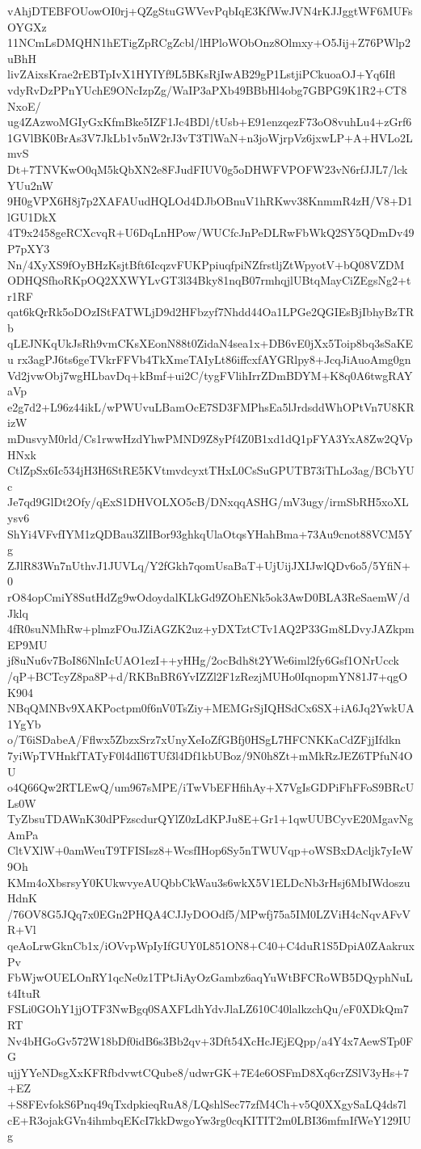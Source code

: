 vAhjDTEBFOUowOI0rj+QZgStuGWVevPqbIqE3KfWwJVN4rKJJggtWF6MUFsOYGXz
11NCmLsDMQHN1hETigZpRCgZcbl/lHPloWObOnz8Olmxy+O5Jij+Z76PWlp2uBhH
livZAixsKrae2rEBTpIvX1HYIYf9L5BKsRjIwAB29gP1LstjiPCkuoaOJ+Yq6Ifl
vdyRvDzPPnYUchE9ONcIzpZg/WaIP3aPXb49BBbHl4obg7GBPG9K1R2+CT8NxoE/
ug4ZAzwoMGIyGxKfmBke5IZF1Jc4BDl/tUsb+E91enzqezF73oO8vuhLu4+zGrf6
1GVlBK0BrAs3V7JkLb1v5nW2rJ3vT3TlWaN+n3joWjrpVz6jxwLP+A+HVLo2LmvS
Dt+7TNVKwO0qM5kQbXN2e8FJudFIUV0g5oDHWFVPOFW23vN6rfJJL7/lckYUu2nW
9H0gVPX6H8j7p2XAFAUudHQLOd4DJbOBnuV1hRKwv38KnmmR4zH/V8+D1lGU1DkX
4T9x2458geRCXcvqR+U6DqLnHPow/WUCfcJnPeDLRwFbWkQ2SY5QDmDv49P7pXY3
Nn/4XyXS9fOyBHzKsjtBft6IcqzvFUKPpiuqfpiNZfrstljZtWpyotV+bQ08VZDM
ODHQSfhoRKpOQ2XXWYLvGT3l34Bky81nqB07rmhqjlUBtqMayCiZEgsNg2+tr1RF
qat6kQrRk5oDOzIStFATWLjD9d2HFbzyf7Nhdd44Oa1LPGe2QGIEsBjIbhyBzTRb
qLEJNKqUkJsRh9vmCKsXEonN88t0ZidaN4sea1x+DB6vE0jXx5Toip8bq3sSaKEu
rx3agPJ6ts6geTVkrFFVb4TkXmeTAIyLt86iffcxfAYGRlpy8+JcqJiAuoAmg0gn
Vd2jvwObj7wgHLbavDq+kBmf+ui2C/tygFVlihIrrZDmBDYM+K8q0A6twgRAYaVp
e2g7d2+L96z44ikL/wPWUvuLBamOcE7SD3FMPhsEa5lJrdsddWhOPtVn7U8KRizW
mDusvyM0rld/Cs1rwwHzdYhwPMND9Z8yPf4Z0B1xd1dQ1pFYA3YxA8Zw2QVpHNxk
CtlZpSx6Ic534jH3H6StRE5KVtmvdcyxtTHxL0CsSuGPUTB73iThLo3ag/BCbYUc
Je7qd9GlDt2Ofy/qExS1DHVOLXO5cB/DNxqqASHG/mV3ugy/irmSbRH5xoXLysv6
ShYi4VFvfIYM1zQDBau3ZlIBor93ghkqUlaOtqsYHahBma+73Au9cnot88VCM5Yg
ZJlR83Wn7nUthvJ1JUVLq/Y2fGkh7qomUsaBaT+UjUijJXIJwlQDv6o5/5YfiN+0
rO84opCmiY8SutHdZg9wOdoydalKLkGd9ZOhENk5ok3AwD0BLA3ReSaemW/dJklq
4fR0suNMhRw+plmzFOuJZiAGZK2uz+yDXTztCTv1AQ2P33Gm8LDvyJAZkpmEP9MU
jf8uNu6v7BoI86NlnIcUAO1ezI++yHHg/2ocBdh8t2YWe6iml2fy6Gsf1ONrUcck
/qP+BCTcyZ8pa8P+d/RKBnBR6YvIZZl2F1zRezjMUHo0IqnopmYN81J7+qgOK904
NBqQMNBv9XAKPoctpm0f6nV0TsZiy+MEMGrSjIQHSdCx6SX+iA6Jq2YwkUA1YgYb
o/T6iSDabeA/Fflwx5ZbzxSrz7xUnyXeIoZfGBfj0HSgL7HFCNKKaCdZFjjIfdkn
7yiWpTVHnkfTATyF0l4dIl6TUf3l4Df1kbUBoz/9N0h8Zt+mMkRzJEZ6TPfuN4OU
o4Q66Qw2RTLEwQ/um967sMPE/iTwVbEFHfihAy+X7VgIsGDPiFhFFoS9BRcULs0W
TyZbsuTDAWnK30dPFzscdurQYlZ0zLdKPJu8E+Gr1+1qwUUBCyvE20MgavNgAmPa
CltVXlW+0amWeuT9TFISIsz8+WcsfIHop6Sy5nTWUVqp+oWSBxDAcljk7yIeW9Oh
KMm4oXbsrsyY0KUkwvyeAUQbbCkWau3s6wkX5V1ELDcNb3rHsj6MbIWdoszuHdnK
/76OV8G5JQq7x0EGn2PHQA4CJJyDOOdf5/MPwfj75a5IM0LZViH4cNqvAFvVR+Vl
qeAoLrwGknCb1x/iOVvpWpIyIfGUY0L851ON8+C40+C4duR1S5DpiA0ZAakruxPv
FbWjwOUELOnRY1qcNe0z1TPtJiAyOzGambz6aqYuWtBFCRoWB5DQyphNuLt4ItuR
FSLi0GOhY1jjOTF3NwBgq0SAXFLdhYdvJlaLZ610C40lalkzchQu/eF0XDkQm7RT
Nv4bHGoGv572W18bDf0idB6s3Bb2qv+3Dft54XcHcJEjEQpp/a4Y4x7AewSTp0FG
ujjYYeNDsgXxKFRfbdvwtCQube8/udwrGK+7E4e6OSFmD8Xq6crZSlV3yHs+7+EZ
+S8FEvfokS6Pnq49qTxdpkieqRuA8/LQshlSec77zfM4Ch+v5Q0XXgySaLQ4ds7l
cE+R3ojakGVn4ihmbqEKcI7kkDwgoYw3rg0cqKITIT2m0LBI36mfmIfWeY129IUg
